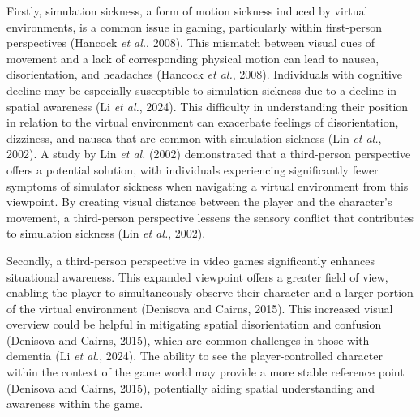 \documentclass{l4proj}
\begin{document}
Firstly, simulation sickness, a form of motion sickness induced by virtual environments, is a common issue in gaming, particularly within first-person perspectives (Hancock \emph{et al.}, 2008). This mismatch between visual cues of movement and a lack of corresponding physical motion can lead to nausea, disorientation, and headaches (Hancock \emph{et al.}, 2008). Individuals with cognitive decline may be especially susceptible to simulation sickness due to a decline in spatial awareness (Li \emph{et al.}, 2024). This difficulty in understanding their position in relation to the virtual environment can exacerbate feelings of disorientation, dizziness, and nausea that are common with simulation sickness (Lin \emph{et al.}, 2002). A study by Lin \emph{et al.} (2002) demonstrated that a third-person perspective offers a potential solution, with individuals experiencing significantly fewer symptoms of simulator sickness when navigating a virtual environment from this viewpoint. By creating visual distance between the player and the character's movement, a third-person perspective lessens the sensory conflict that contributes to simulation sickness (Lin \emph{et al.}, 2002).

Secondly, a third-person perspective in video games significantly enhances situational awareness. This expanded viewpoint offers a greater field of view, enabling the player to simultaneously observe their character and a larger portion of the virtual environment (Denisova and Cairns, 2015). This increased visual overview could be helpful in mitigating spatial disorientation and confusion (Denisova and Cairns, 2015), which are common challenges in those with dementia (Li \emph{et al.}, 2024). The ability to see the player-controlled character within the context of the game world may provide a more stable reference point (Denisova and Cairns, 2015), potentially aiding spatial understanding and awareness within the game.


\end{document}

